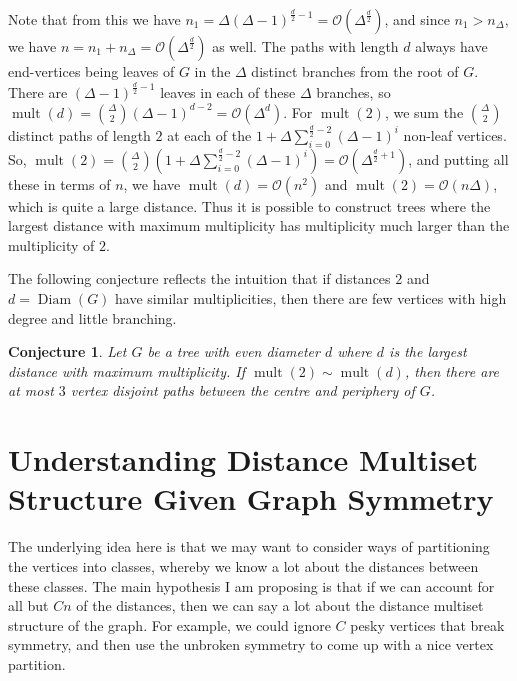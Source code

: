 \documentclass[12]{article}
\DeclareMathOperator{\diam}{Diam}
\DeclareMathOperator{\mult}{mult}
\newtheorem{conj}[thm]{Conjecture}
\theoremstyle{definition}
\begin{document}
	Note that from this we have $n_1 = \Delta(\Delta-1)^{\tfrac{d}{2}-1} = \mathcal{O}(\Delta^{\tfrac{d}{2}})$, and since $n_1 > n_\Delta$, we have $n = n_1 + n_\Delta = \mathcal{O}(\Delta^{\tfrac{d}{2}})$ as well.  The paths with length $d$ always have end-vertices being leaves of $G$ in the $\Delta$ distinct branches from the root of $G$.  There are $(\Delta-1)^{\tfrac{d}{2}-1}$ leaves in each of these $\Delta$ branches, so $\mult(d) = {\Delta \choose 2}(\Delta-1)^{d-2} = \mathcal{O}(\Delta^d)$.  For $\mult(2)$, we sum the ${\Delta \choose 2}$ distinct paths of length $2$ at each of the $1 + \Delta\sum_{i=0}^{\tfrac{d}{2}-2}(\Delta - 1)^i$ non-leaf vertices.  So, $\mult(2) = {\Delta \choose 2}(1 + \Delta\sum_{i=0}^{\tfrac{d}{2}-2}(\Delta - 1)^i) = \mathcal{O}(\Delta^{\tfrac{d}{2}+1})$, and putting all these in terms of $n$, we have $\mult(d) = \mathcal{O}(n^2)$ and $\mult(2) = \mathcal{O}(n\Delta)$, which is quite a large distance.  Thus it is possible to construct trees where the largest distance with maximum multiplicity has multiplicity much larger than the multiplicity of $2$.
	
	The following conjecture reflects the intuition that if distances $2$ and $d = \diam(G)$ have similar multiplicities, then there are few vertices with high degree and little branching.
	
	\begin{conj}
		Let $G$ be a tree with even diameter $d$ where $d$ is the largest distance with maximum multiplicity.  If $\mult(2) \sim \mult(d)$, then there are at most $3$ vertex disjoint paths between the centre and periphery of $G$.
	\end{conj}
	
	\iffalse
	\section{Understanding Distance Multiset Structure Given Graph Symmetry}
	
	The underlying idea here is that we may want to consider ways of partitioning the vertices into classes, whereby we know a lot about the distances between these classes.  The main hypothesis I am proposing is that if we can account for all but $Cn$ of the distances, then we can say a lot about the distance multiset structure of the graph.  For example, we could ignore $C$ pesky vertices that break symmetry, and then use the unbroken symmetry to come up with a nice vertex partition.
	
\end{document}
